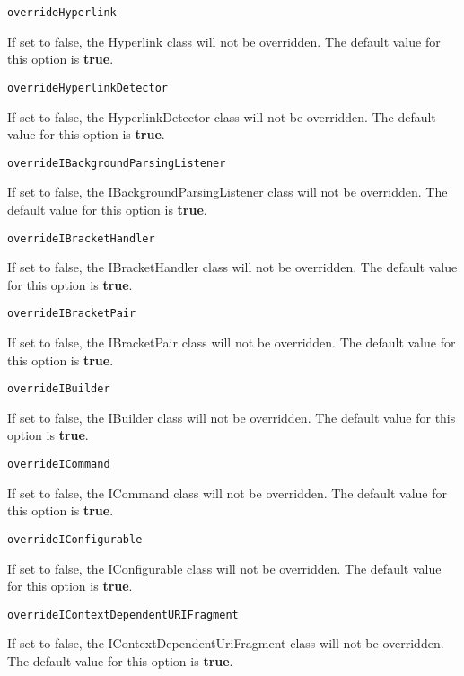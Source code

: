 \noindent\texttt{overrideHyperlink}
\begin{myindentpar}{1cm}
If set to false, the Hyperlink class will not be overridden. The default value for this option is \textbf{true}.
\end{myindentpar}

\noindent\texttt{overrideHyperlinkDetector}
\begin{myindentpar}{1cm}
If set to false, the HyperlinkDetector class will not be overridden. The default value for this option is \textbf{true}.
\end{myindentpar}

\noindent\texttt{overrideIBackgroundParsingListener}
\begin{myindentpar}{1cm}
If set to false, the IBackgroundParsingListener class will not be overridden. The default value for this option is \textbf{true}.
\end{myindentpar}

\noindent\texttt{overrideIBracketHandler}
\begin{myindentpar}{1cm}
If set to false, the IBracketHandler class will not be overridden. The default value for this option is \textbf{true}.
\end{myindentpar}

\noindent\texttt{overrideIBracketPair}
\begin{myindentpar}{1cm}
If set to false, the IBracketPair class will not be overridden. The default value for this option is \textbf{true}.
\end{myindentpar}

\noindent\texttt{overrideIBuilder}
\begin{myindentpar}{1cm}
If set to false, the IBuilder class will not be overridden. The default value for this option is \textbf{true}.
\end{myindentpar}

\noindent\texttt{overrideICommand}
\begin{myindentpar}{1cm}
If set to false, the ICommand class will not be overridden. The default value for this option is \textbf{true}.
\end{myindentpar}

\noindent\texttt{overrideIConfigurable}
\begin{myindentpar}{1cm}
If set to false, the IConfigurable class will not be overridden. The default value for this option is \textbf{true}.
\end{myindentpar}

\noindent\texttt{overrideIContextDependentURIFragment}
\begin{myindentpar}{1cm}
If set to false, the IContextDependentUriFragment class will not be overridden. The default value for this option is \textbf{true}.
\end{myindentpar}

